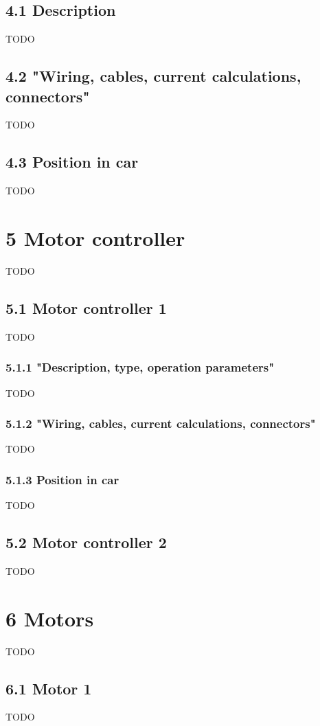\documentclass{article}
\begin{document}
\subsection*{4.1 Description}
TODO

\subsection*{4.2 "Wiring, cables, current calculations, connectors"}
TODO

\subsection*{4.3 Position in car}
TODO

\section*{5 Motor controller}
TODO

\subsection*{5.1 Motor controller 1}
TODO

\subsubsection*{5.1.1 "Description, type, operation parameters"}
TODO

\subsubsection*{5.1.2 "Wiring, cables, current calculations, connectors"}
TODO

\subsubsection*{5.1.3 Position in car}
TODO

\subsection*{5.2 Motor controller 2}
TODO

\section*{6 Motors}
TODO

\subsection*{6.1 Motor 1}
TODO
\end{document}
